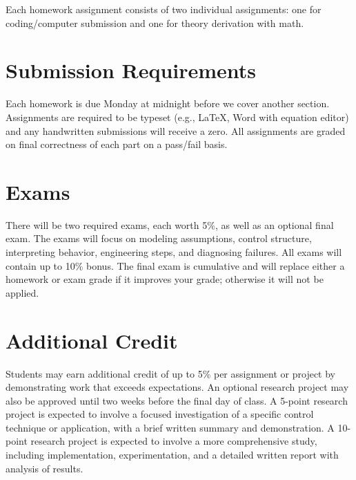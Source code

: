 \documentclass[11pt,letterpaper]{article}
\begin{document}
Each homework assignment consists of two individual assignments: one for coding/computer submission and one for theory derivation with math.

\section*{Submission Requirements}

Each homework is due Monday at midnight before we cover another section. Assignments are required to be typeset (e.g., \LaTeX, Word with equation editor) and any handwritten submissions will receive a zero. All assignments are graded on final correctness of each part on a pass/fail basis.

\section*{Exams}

There will be two required exams, each worth 5\%, as well as an optional final exam. The exams will focus on modeling assumptions, control structure, interpreting behavior, engineering steps, and diagnosing failures. All exams will contain up to 10\% bonus. The final exam is cumulative and will replace either a homework or exam grade if it improves your grade; otherwise it will not be applied.

\section*{Additional Credit}

Students may earn additional credit of up to 5\% per assignment or project by demonstrating work that exceeds expectations. An optional research project may also be approved until two weeks before the final day of class. A 5-point research project is expected to involve a focused investigation of a specific control technique or application, with a brief written summary and demonstration. A 10-point research project is expected to involve a more comprehensive study, including implementation, experimentation, and a detailed written report with analysis of results.
\end{document}

